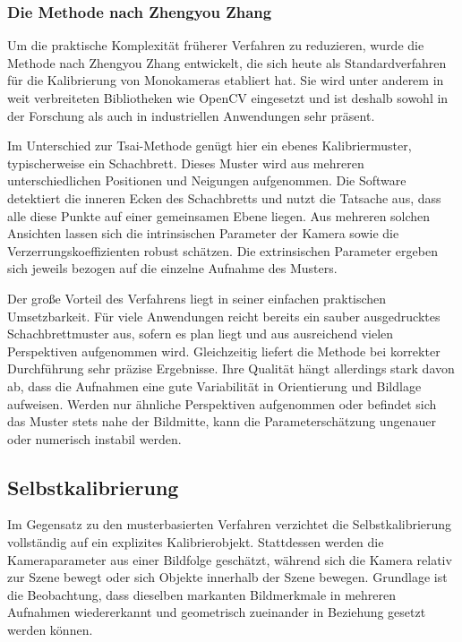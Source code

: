 \documentclass[12pt,a4paper,parskip=half]{scrartcl}
\begin{document}
\subsubsection{Die Methode nach Zhengyou Zhang}
Um die praktische Komplexität früherer Verfahren zu reduzieren, wurde die Methode nach Zhengyou Zhang entwickelt, die sich heute als Standardverfahren für die Kalibrierung von Monokameras etabliert hat. Sie wird unter anderem in weit verbreiteten Bibliotheken wie OpenCV eingesetzt und ist deshalb sowohl in der Forschung als auch in industriellen Anwendungen sehr präsent.

Im Unterschied zur Tsai-Methode genügt hier ein ebenes Kalibriermuster, typischerweise ein Schachbrett. Dieses Muster wird aus mehreren unterschiedlichen Positionen und Neigungen aufgenommen. Die Software detektiert die inneren Ecken des Schachbretts und nutzt die Tatsache aus, dass alle diese Punkte auf einer gemeinsamen Ebene liegen. Aus mehreren solchen Ansichten lassen sich die intrinsischen Parameter der Kamera sowie die Verzerrungskoeffizienten robust schätzen. Die extrinsischen Parameter ergeben sich jeweils bezogen auf die einzelne Aufnahme des Musters.

Der große Vorteil des Verfahrens liegt in seiner einfachen praktischen Umsetzbarkeit. Für viele Anwendungen reicht bereits ein sauber ausgedrucktes Schachbrettmuster aus, sofern es plan liegt und aus ausreichend vielen Perspektiven aufgenommen wird. Gleichzeitig liefert die Methode bei korrekter Durchführung sehr präzise Ergebnisse. Ihre Qualität hängt allerdings stark davon ab, dass die Aufnahmen eine gute Variabilität in Orientierung und Bildlage aufweisen. Werden nur ähnliche Perspektiven aufgenommen oder befindet sich das Muster stets nahe der Bildmitte, kann die Parameterschätzung ungenauer oder numerisch instabil werden.


\subsection{Selbstkalibrierung}
Im Gegensatz zu den musterbasierten Verfahren verzichtet die Selbstkalibrierung vollständig auf ein explizites Kalibrierobjekt. Stattdessen werden die Kameraparameter aus einer Bildfolge geschätzt, während sich die Kamera relativ zur Szene bewegt oder sich Objekte innerhalb der Szene bewegen. Grundlage ist die Beobachtung, dass dieselben markanten Bildmerkmale in mehreren Aufnahmen wiedererkannt und geometrisch zueinander in Beziehung gesetzt werden können.
\end{document}
